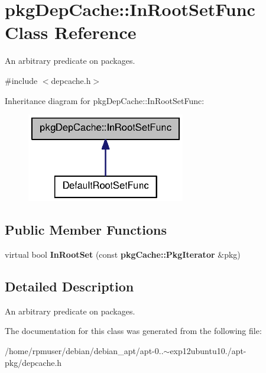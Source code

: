 \section{pkg\-Dep\-Cache\-:\-:\-In\-Root\-Set\-Func \-Class \-Reference}
\label{classpkgDepCache_1_1InRootSetFunc}


\-An arbitrary predicate on packages.  




{\ttfamily \#include $<$depcache.\-h$>$}



\-Inheritance diagram for pkg\-Dep\-Cache\-:\-:\-In\-Root\-Set\-Func\-:
\nopagebreak
\begin{figure}[H]
\begin{center}
\leavevmode
\includegraphics[width=196pt]{classpkgDepCache_1_1InRootSetFunc__inherit__graph}
\end{center}
\end{figure}
\subsection*{\-Public \-Member \-Functions}
\begin{DoxyCompactItemize}
\item 
virtual bool {\bfseries \-In\-Root\-Set} (const {\bf pkg\-Cache\-::\-Pkg\-Iterator} \&pkg)\label{classpkgDepCache_1_1InRootSetFunc_afe41df513f963761eda1f8e217198107}

\end{DoxyCompactItemize}


\subsection{\-Detailed \-Description}
\-An arbitrary predicate on packages. 

\-The documentation for this class was generated from the following file\-:\begin{DoxyCompactItemize}
\item 
/home/rpmuser/debian/debian\-\_\-apt/apt-\/0..$\sim$exp12ubuntu10./apt-\/pkg/depcache.\-h\end{DoxyCompactItemize}
